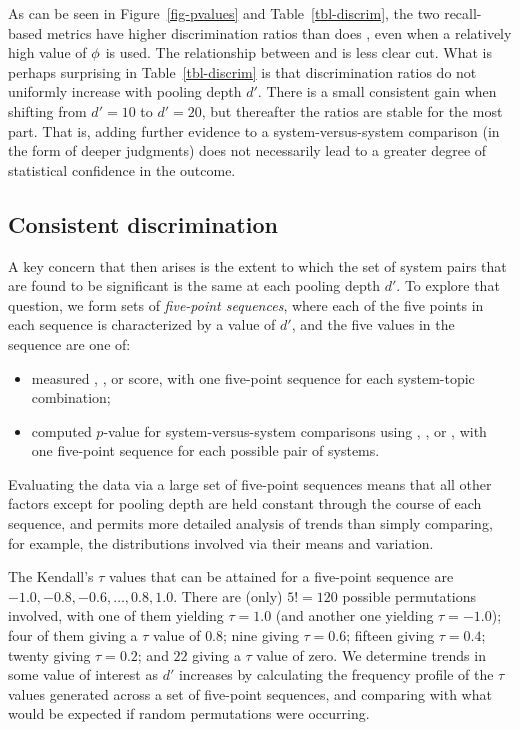 As can be seen in Figure~\ref{fig-pvalues} and
Table~\ref{tbl-discrim}, the two recall-based metrics have higher
discrimination ratios than does {\rbp}, even when a relatively high
value of $\mbox{$\phi$}$ is used.
The relationship between {\ap} and {\ndcg} is less clear cut.
What is perhaps surprising in Table~\ref{tbl-discrim} is that
discrimination ratios do not uniformly increase with pooling depth
$d'$.
There is a small consistent gain when shifting from $d'=10$ to
$d'=20$, but thereafter the ratios are stable for the most part.
That is, adding further evidence to a system-versus-system comparison
(in the form of deeper judgments) does not necessarily lead to a
greater degree of statistical confidence in the outcome.


\subsection{Consistent discrimination}

A key concern that then arises is the extent to which the set of
system pairs that are found to be significant is the same at each
pooling depth $d'$.
To explore that question, we form sets of {\emph{five-point
sequences}}, where each of the five points in each sequence is
characterized by a value of $d'$, and the five values in the sequence
are one of:
\begin{itemize}[leftmargin=5mm]
\item
measured {\ap}, {\ndcg}, or {\rbp} score, with one five-point
sequence for each system-topic combination;
\item
computed $p$-value for system-versus-system comparisons using {\ap},
{\ndcg}, or {\rbp}, with one five-point sequence for each possible
pair of systems.
\end{itemize}
Evaluating the data via a large set of five-point sequences means
that all other factors except for pooling depth are held constant
through the course of each sequence, and permits more detailed
analysis of trends than simply comparing, for example, the
distributions involved via their means and variation.

The Kendall's $\tau$ values that can be attained for a five-point
sequence are $-1.0, -0.8, -0.6, \ldots, 0.8, 1.0$.
There are (only) $5!=120$ possible permutations involved, with one of
them yielding $\tau=1.0$ (and another one yielding $\tau=-1.0$); four
of them giving a $\tau$ value of $0.8$; nine giving $\tau=0.6$;
fifteen giving $\tau=0.4$; twenty giving $\tau=0.2$; and $22$ giving
a $\tau$ value of zero.
We determine trends in some value of interest as $d'$ increases by
calculating the frequency profile of the $\tau$ values generated
across a set of five-point sequences, and comparing with what would
be expected if random permutations were occurring.

